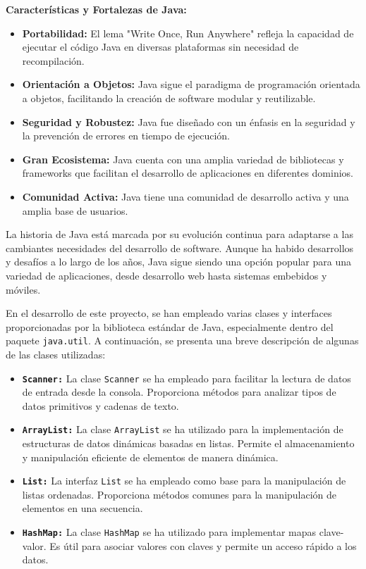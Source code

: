 \documentclass{article}
\begin{document}
	\textbf{Características y Fortalezas de Java:}
	\begin{itemize}
		\item \textbf{Portabilidad:} El lema "Write Once, Run Anywhere" refleja la capacidad de ejecutar el código Java en diversas plataformas sin necesidad de recompilación.
		
		\item \textbf{Orientación a Objetos:} Java sigue el paradigma de programación orientada a objetos, facilitando la creación de software modular y reutilizable.
		
		\item \textbf{Seguridad y Robustez:} Java fue diseñado con un énfasis en la seguridad y la prevención de errores en tiempo de ejecución.
		
		\item \textbf{Gran Ecosistema:} Java cuenta con una amplia variedad de bibliotecas y frameworks que facilitan el desarrollo de aplicaciones en diferentes dominios.
		
		\item \textbf{Comunidad Activa:} Java tiene una comunidad de desarrollo activa y una amplia base de usuarios.
	\end{itemize}
	
	La historia de Java está marcada por su evolución continua para adaptarse a las cambiantes necesidades del desarrollo de software. Aunque ha habido desarrollos y desafíos a lo largo de los años, Java sigue siendo una opción popular para una variedad de aplicaciones, desde desarrollo web hasta sistemas embebidos y móviles.
	
	En el desarrollo de este proyecto, se han empleado varias clases y interfaces proporcionadas por la biblioteca estándar de Java, especialmente dentro del paquete \texttt{java.util}. A continuación, se presenta una breve descripción de algunas de las clases utilizadas:
	
	\begin{itemize}
		\item \textbf{\texttt{Scanner:}} La clase \texttt{Scanner} se ha empleado para facilitar la lectura de datos de entrada desde la consola. Proporciona métodos para analizar tipos de datos primitivos y cadenas de texto.
		
		\item \textbf{\texttt{ArrayList:}} La clase \texttt{ArrayList} se ha utilizado para la implementación de estructuras de datos dinámicas basadas en listas. Permite el almacenamiento y manipulación eficiente de elementos de manera dinámica.
		
		\item \textbf{\texttt{List:}} La interfaz \texttt{List} se ha empleado como base para la manipulación de listas ordenadas. Proporciona métodos comunes para la manipulación de elementos en una secuencia.
		
		\item \textbf{\texttt{HashMap:}} La clase \texttt{HashMap} se ha utilizado para implementar mapas clave-valor. Es útil para asociar valores con claves y permite un acceso rápido a los datos.
	\end{itemize}
	
\end{document}
